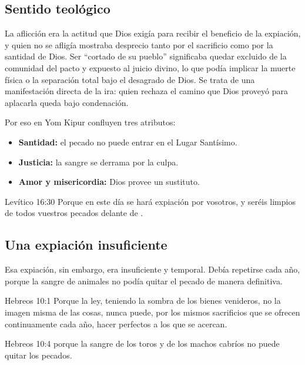 \subsection{Sentido teológico}
La aflicción era la actitud que Dios exigía para recibir el beneficio de la expiación, y quien no se afligía mostraba desprecio tanto por el sacrificio como por la santidad de Dios. Ser ``cortado de su pueblo'' significaba quedar excluido de la comunidad del pacto y expuesto al juicio divino, lo que podía implicar la muerte física o la separación total bajo el desagrado de Dios. Se trata de una manifestación directa de la ira: quien rechaza el camino que Dios proveyó para aplacarla queda bajo condenación.

Por eso en Yom Kipur confluyen tres atributos:
\begin{itemize}
\item \textbf{Santidad:} el pecado no puede entrar en el Lugar Santísimo.
\item \textbf{Justicia:} la sangre se derrama por la culpa.
\item \textbf{Amor y misericordia:} Dios provee un sustituto.
\end{itemize}

\begin{verso}{Levítico 16:30}
Porque en este día se hará expiación por vosotros, y seréis limpios de todos vuestros pecados delante de \SENOR.
\end{verso}

\subsection{Una expiación insuficiente}
Esa expiación, sin embargo, era insuficiente y temporal. Debía repetirse cada año, porque la sangre de animales no podía quitar el pecado de manera definitiva.

\begin{verso}{Hebreos 10:1}
Porque la ley, teniendo la sombra de los bienes venideros, no la imagen misma de las cosas, nunca puede, por los mismos sacrificios que se ofrecen continuamente cada año, hacer perfectos a los que se acercan.
\end{verso}

\begin{verso}{Hebreos 10:4}
porque la sangre de los toros y de los machos cabríos no puede quitar los pecados.
\end{verso}

